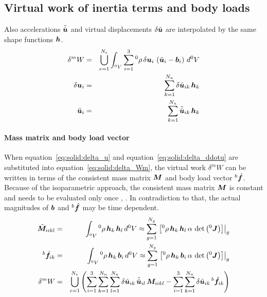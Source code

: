 \subsection{Virtual work of inertia terms and body loads}
Also accelerations $\ddot{\hat{\bm{u}}}$ and virtual displacements $\delta\hat{\bm{u}}$ are interpolated by the same shape functions $\bm{h}$.
\begin{eqnarray}
\delta^{m}W & = & \bigcup_{e=1}^{N_e} \int_{^0V} \sum_{i=1}^3 {^0}\rho \, \delta\bm{u}_i \, \left(\ddot{\bm{u}}_i - \bm{b}_i\right) \, d^0V \label{eq:solid:delta_Wm} \\
\delta\bm{u}_i & = & \sum_{k=1}^{N_n} \delta\hat{\bm{u}}_{ik} \, \bm{h}_k \label{eq:solid:delta_u} \\
\ddot{\bm{u}}_i & = & \sum_{k=1}^{N_n} \ddot{\hat{\bm{u}}}_{ik} \, \bm{h}_k \label{eq:solid:delta_ddotu}
\end{eqnarray}

\paragraph{Mass matrix and body load vector}
When equation~\ref{eq:solid:delta_u} and equation~\ref{eq:solid:delta_ddotu} are substituted into equation~\ref{eq:solid:delta_Wm},
the virtual work $\delta^mW$ can be written in terms of the consistent mass matrix $\bm{M}$ and body load vector $^b\hat{\bm{f}}$.
Because of the isoparametric approach, the consistent mass matrix $\bm{M}$ is constant and needs to be evaluated only once \cite{BATHE2016}, \cite{KUEBLER2005}.
In contradiction to that, the actual magnitudes of $\bm{b}$ and $^b\hat{\bm{f}}$ may be time dependent.
\begin{eqnarray}
\hat{\bm{M}}_{iikl} & = & \int_{^0V} {^0}\rho \, \bm{h}_k \, \bm{h}_l \, d^0V \approx \sum_{g=1}^{N_g} \left.\left[{^0}\rho \, \bm{h}_k \, \bm{h}_l \, \alpha \, \det{\left({^0}\bm{J}\right)}\right]\right\vert_{g} \\
{^b}\hat{\bm{f}}_{ik} & = & \int_{^0V} {^0}\rho \, \bm{h}_k \, \bm{b}_i \, d^0V \approx \sum_{g=1}^{N_g} \left.\left[{^0}\rho \, \bm{h}_k \, \bm{b}_i \, \alpha \, \det{\left({^0}\bm{J}\right)}\right]\right\vert_{g} \\
\delta^{m}W & = & \bigcup_{e=1}^{N_e}\left(\sum_{i=1}^3\sum_{k=1}^{N_n}\sum_{l=1}^{N_n} \delta\hat{\bm{u}}_{ik} \, \ddot{\hat{\bm{u}}}_{il} \, \bm{M}_{iikl}
 - \sum_{i=1}^3\sum_{k=1}^{N_n} \delta\hat{\bm{u}}_{ik} \, {^b}\hat{\bm{f}}_{ik}\right)
\end{eqnarray}

